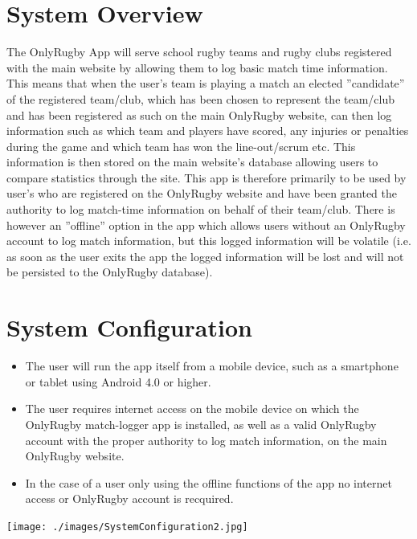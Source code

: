 \documentclass[hidelinks,a4paper,12pt]{article}
\begin{document}
\section{System Overview} 
The OnlyRugby App will serve school rugby teams and rugby clubs registered with the main website by allowing them to log basic match time information. This means that when the user's team is playing a match an elected ''candidate'' of the registered team/club, which has been chosen to represent the team/club and has been registered as such on the main OnlyRugby website, can then log information such as which team and players have scored, any injuries or penalties during the game and which team has won the line-out/scrum etc. This information is then stored on the main website's database allowing users to compare statistics through the site. This app is therefore primarily to be used by user's who are registered on the OnlyRugby website and have been granted the authority to log match-time information on behalf of their team/club. There is however an ''offline'' option in the app which allows users without an OnlyRugby account to log match information, but this logged information will be volatile (i.e. as soon as the user exits the app the logged information will be lost and will not be persisted to the OnlyRugby database).
\section{System Configuration}
\begin {itemize}
	\item The user will run the app itself from a mobile device, such as a smartphone or tablet using Android 4.0 or higher.
	\item The user requires internet access on the mobile device on which the OnlyRugby match-logger app is installed, as well as a valid OnlyRugby account with the proper authority to log match information, on the main OnlyRugby website.
	\item In the case of a user only using the offline functions of the app no internet access or OnlyRugby account is recquired.
\end{itemize}
\begin{center}
  	 \texttt{[image: ./images/SystemConfiguration2.jpg]}\\[0.4cm]
\end{center}
\end{document}
